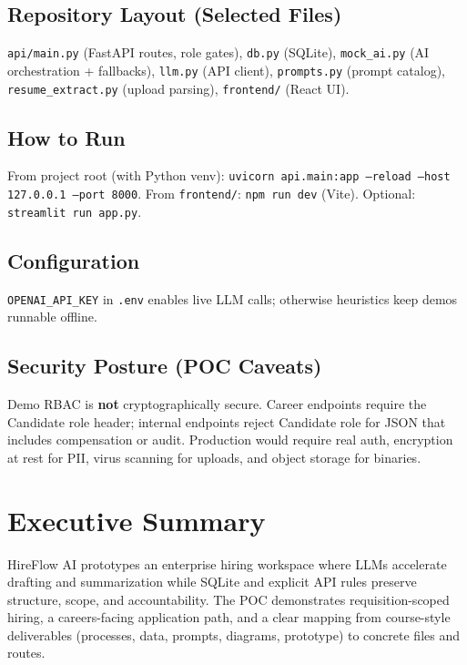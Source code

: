 \documentclass[12pt]{article}
\begin{document}
\subsection{Repository Layout (Selected Files)}

\texttt{api/main.py} (FastAPI routes, role gates), \texttt{db.py} (SQLite), \texttt{mock\_ai.py} (AI orchestration + fallbacks), \texttt{llm.py} (API client), \texttt{prompts.py} (prompt catalog), \texttt{resume\_extract.py} (upload parsing), \texttt{frontend/} (React UI).

\subsection{How to Run}

From project root (with Python venv): \texttt{uvicorn api.main:app --reload --host 127.0.0.1 --port 8000}. From \texttt{frontend/}: \texttt{npm run dev} (Vite). Optional: \texttt{streamlit run app.py}.

\subsection{Configuration}

\texttt{OPENAI\_API\_KEY} in \texttt{.env} enables live LLM calls; otherwise heuristics keep demos runnable offline.

\subsection{Security Posture (POC Caveats)}

Demo RBAC is \textbf{not} cryptographically secure. Career endpoints require the Candidate role header; internal endpoints reject Candidate role for JSON that includes compensation or audit. Production would require real auth, encryption at rest for PII, virus scanning for uploads, and object storage for binaries.

\section{Executive Summary}

HireFlow AI prototypes an enterprise hiring workspace where LLMs accelerate drafting and summarization while SQLite and explicit API rules preserve structure, scope, and accountability. The POC demonstrates requisition-scoped hiring, a careers-facing application path, and a clear mapping from course-style deliverables (processes, data, prompts, diagrams, prototype) to concrete files and routes.
\end{document}
